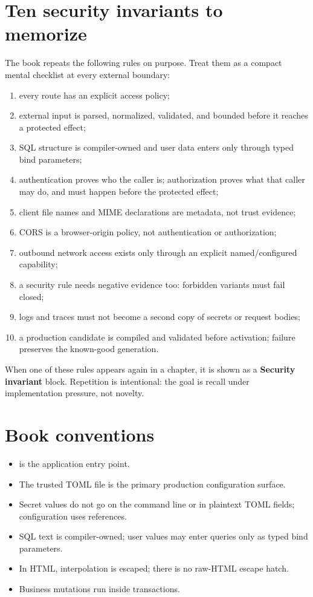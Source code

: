 \section*{Ten security invariants to memorize}

The book repeats the following rules on purpose. Treat them as a compact mental checklist at every external boundary:

\begin{enumerate}
  \item every route has an explicit access policy;
  \item external input is parsed, normalized, validated, and bounded before it reaches a protected effect;
  \item SQL structure is compiler-owned and user data enters only through typed bind parameters;
  \item authentication proves who the caller is; authorization proves what that caller may do, and must happen before the protected effect;
  \item client file names and MIME declarations are metadata, not trust evidence;
  \item CORS is a browser-origin policy, not authentication or authorization;
  \item outbound network access exists only through an explicit named/configured capability;
  \item a security rule needs negative evidence too: forbidden variants must fail closed;
  \item logs and traces must not become a second copy of secrets or request bodies;
  \item a production candidate is compiled and validated before activation; failure preserves the known-good generation.
\end{enumerate}

When one of these rules appears again in a chapter, it is shown as a \textbf{Security invariant} block. Repetition is intentional: the goal is recall under implementation pressure, not novelty.

\section*{Book conventions}

\begin{itemize}
  \item {} is the application entry point.
  \item The trusted TOML file is the primary production configuration surface.
  \item Secret values do not go on the command line or in plaintext TOML fields; configuration uses  references.
  \item SQL text is compiler-owned; user values may enter queries only as typed bind parameters.
  \item In HTML,  interpolation is escaped; there is no raw-HTML escape hatch.
  \item Business mutations run inside transactions.
\end{itemize}

